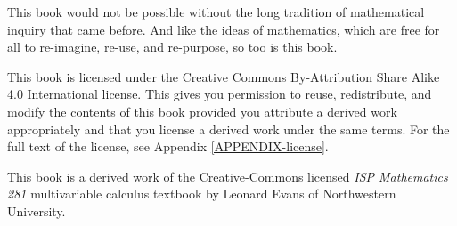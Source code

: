 This book would not be possible without the long tradition
of mathematical inquiry that came before.  And like the 
ideas of mathematics, which are free for all to re-imagine,
re-use, and re-purpose, so too is this book.

This book is licensed under the Creative Commons By-Attribution
Share Alike 4.0 International license.  This gives you permission
to reuse, redistribute, and modify the contents of this book provided
you attribute a derived work appropriately and that you
license a derived work under the same terms.  For the full text
of the license, see Appendix \ref{APPENDIX-license}.

This book is a derived work of the Creative-Commons licensed 
\emph{ISP Mathematics 281} multivariable calculus textbook by 
Leonard Evans of Northwestern University.
